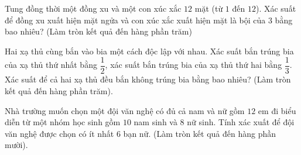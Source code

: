 \begin{ex}%
	Tung đồng thời một đồng xu và một con xúc xắc $12$ mặt (từ $1$ đến $12$). Xác suất để đồng xu xuất hiện mặt ngửa  và con xúc xắc xuất hiện mặt là bội của $3$ bằng bao nhiêu? (Làm tròn kết quả đến hàng phần trăm)
\end{ex}

\begin{ex}%
	Hai xạ thủ cùng bắn vào bia một cách độc lập với nhau. Xác suất bắn trúng bia của xạ thủ thứ nhất bằng $\dfrac{1}{2}$, xác suất bắn trúng bia của xạ  thủ thứ hai bằng $\dfrac{1}{3}$. Xác suất để cả hai xạ thủ đều bắn không trúng bia bằng bao nhiêu? (Làm tròn kết quả đến hàng phần trăm).
\end{ex}

\begin{ex}%
	Nhà trường muốn chọn một đội văn nghệ  có đủ cả nam và nữ gồm $12$ em đi biểu diễn từ một nhóm học sinh gồm $10$ nam sinh và $8$ nữ sinh. Tính xác xuất để đội văn nghệ được chọn có ít nhất 6 bạn nữ. (Làm tròn kết quả đến hàng phần mười).
\end{ex}

